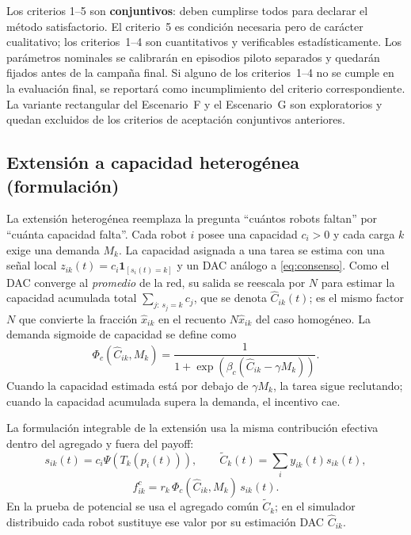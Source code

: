 Los criterios 1--5 son \textbf{conjuntivos}: deben cumplirse todos para declarar el
método satisfactorio. El criterio~5 es condición necesaria pero de carácter
cualitativo; los criterios~1--4 son cuantitativos y verificables estadísticamente.
Los parámetros nominales se calibrarán en episodios piloto separados y quedarán fijados
antes de la campaña final. Si alguno de los criterios~1--4 no se cumple en la evaluación
final, se reportará como incumplimiento del criterio correspondiente. La variante
rectangular del Escenario~F y el Escenario~G son exploratorios y quedan excluidos de los
criterios de aceptación conjuntivos anteriores.

\subsection{Extensión a capacidad heterogénea (formulación)}
\label{subsec:heterogenea}

La extensión heterogénea reemplaza la pregunta ``cuántos robots faltan'' por ``cuánta
capacidad falta''. Cada robot $i$ posee una capacidad $c_i>0$ y cada carga $k$ exige una
demanda $M_k$. La capacidad asignada a una tarea se estima con una señal local
$z_{ik}(t)=c_i\mathbf{1}_{[s_i(t)=k]}$ y un DAC análogo a \eqref{eq:consenso}. Como el
DAC converge al \emph{promedio} de la red, su salida se reescala por $N$ para estimar la
capacidad acumulada total $\sum_{j:\,s_j=k} c_j$, que se denota $\hat{C}_{ik}(t)$; es el
mismo factor $N$ que convierte la fracción $\hat{x}_{ik}$ en el recuento $N\hat{x}_{ik}$
del caso homogéneo. La demanda sigmoide de capacidad se define como
\begin{equation}
  \Phi_c(\hat{C}_{ik},M_k)=
  \frac{1}{1+\exp\!\left(\beta_c(\hat{C}_{ik}-\gamma M_k)\right)}.
  \label{eq:sigmoid_capacity}
\end{equation}
Cuando la capacidad estimada está por debajo de $\gamma M_k$, la tarea sigue
reclutando; cuando la capacidad acumulada supera la demanda, el incentivo cae.

La formulación integrable de la extensión usa la misma contribución efectiva dentro del
agregado y fuera del payoff:
\begin{equation}
  s_{ik}(t)=c_i\Psi\!\left(T_k(p_i(t))\right),
  \qquad
  \widetilde C_k(t)=\sum_i y_{ik}(t)s_{ik}(t),
  \label{eq:capacidad_efectiva_impl}
\end{equation}
\begin{equation}
  f^c_{ik}=r_k\,\Phi_c(\widehat C_{ik},M_k)\,s_{ik}(t).
  \label{eq:payoff_capacity}
\end{equation}
En la prueba de potencial se usa el agregado común $\widetilde C_k$; en el simulador
distribuido cada robot sustituye ese valor por su estimación DAC $\widehat C_{ik}$.

